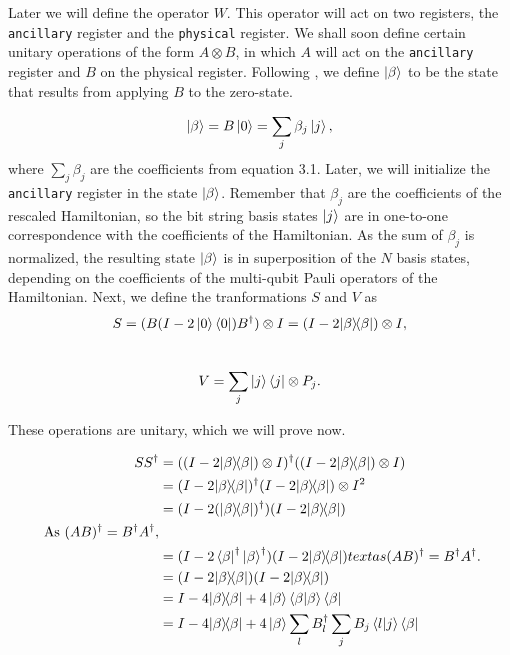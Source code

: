 Later we will define the operator $W$. This operator will act on two registers, the \verb|ancillary| register and the \verb|physical| register. We shall soon define certain unitary operations of the form $A\otimes B$, in which $A$ will act on the \verb|ancillary| register and $B$ on the physical register. Following \textcite{poulin}, we define $\left\vert{\beta}\right\rangle$ to be the state that results from applying $B$ to the zero-state.

$$
\left\vert{\beta}\right\rangle = B\left\vert{0}\right\rangle = \sum_j \beta_j \left\vert{j}\right\rangle,
$$
where $\sum_j \beta_j$ are the coefficients from equation 3.1.
Later, we will initialize the \verb|ancillary| register in the state $\left\vert{\beta}\right\rangle$. Remember that $\beta_j$ are the coefficients of the rescaled Hamiltonian, so the bit string basis states $\left\vert{j}\right\rangle$ are in one-to-one correspondence with the coefficients of the Hamiltonian. As the sum of $\beta_j$ is normalized, the resulting state $\left\vert{\beta}\right\rangle$ is in superposition of the $N$ basis states, depending on the coefficients of the multi-qubit Pauli operators of the Hamiltonian. Next, we define the tranformations $S$ and $V$ as
\begin{equation}
S = (B (I - 2 \left\vert{0}\right\rangle\left\langle{0}\right\vert) B^{\dagger}) \otimes I= (I-2| \beta \rangle\!\langle \beta |) \otimes I,
\end{equation}
\\
\begin{equation}
V=\sum_{j}\left\vert{j}\right\rangle\left\langle{j}\right\vert \otimes P_{j}.
\end{equation}

These operations are unitary, which we will prove now.

\begin{align} \begin{split}
SS^{\dagger} &= ((I-2\kb \beta \beta) \otimes I)^{\dagger}((I-2\kb \beta \beta) \otimes I)\\
&= (I-2\kb \beta \beta)^{\dagger}(I-2\kb \beta \beta) \otimes I^2 \\
&= (I - 2 (\kb \beta \beta)^{\dagger})(I-2\kb \beta \beta)\\ \text{ As } (AB)^{\dagger} = B^{\dagger}A^{\dagger},\\
&= (I - 2 \bra{\beta}^{\dagger} \ket{\beta}^{\dagger})(I-2\kb \beta \beta) text{ as } (AB)^{\dagger} = B^{\dagger}A^{\dagger}.\\
&= (I-2\kb \beta \beta)(I-2\kb \beta \beta)\\
&= I - 4 \kb \beta \beta + 4 \ket{\beta}\braket{\beta}{\beta} \bra{\beta}\\
&= I - 4 \kb \beta \beta + 4 \ket{\beta} \sum_l B_l^{\dagger} \sum_j B_j \braket{l}{j}  \bra{\beta}\\
\end{split} \end{align}

